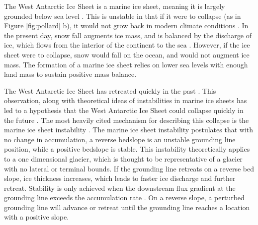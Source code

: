The West Antarctic Ice Sheet is a marine ice sheet, meaning it is largely grounded below sea level \citep{fretwell2013bedmap2}. This is unstable in that if it were to collapse (as in Figure \ref{fig:pollard} b), it would not grow back in modern climate conditions \citep{oerlemans2021analytical}. In the present day, snow fall augments ice mass, and is balanced by the discharge of ice, which flows from the interior of the continent to the sea \citep{rignot2002mass,paterson2016physics}. However, if the ice sheet were to collapse, snow would fall on the ocean, and would not augment ice mass. The formation of a marine ice sheet relies on lower sea levels with enough land mass to sustain positive mass balance. 

The West Antarctic Ice Sheet has retreated quickly in the past \citep{yokoyama2016widespread}. This observation, along with theoretical ideas of instabilities in marine ice sheets \citep[e.g.][]{katz2010stability} has led to a hypothesis that the West Antarctic Ice Sheet could collapse quickly in the future \citep{vaughan2008west}.
The most heavily cited mechanism for describing this collapse is the marine ice sheet instability \citep{weertman1974stability}. The marine ice sheet instability postulates that with no change in accumulation, a reverse bedslope is an unstable grounding line position, while a positive bedslope is stable. This instability theoretically applies to a one dimensional glacier, which is thought to be representative of a glacier with no lateral or terminal bounds.  If the grounding line retreats on a reverse bed slope, ice thickness increases, which leads to faster ice discharge and  further retreat.  Stability is only achieved when the downstream flux gradient at the grounding line exceeds the accumulation rate \citep{weertman1974stability}. On a reverse slope, a perturbed grounding line will advance or retreat until the grounding line reaches a location with a positive slope. 

